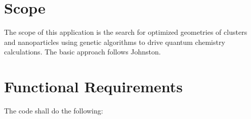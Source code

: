 \label{Requirements}

\section{Scope}
\label{Scope}

The scope of this application is the search for optimized geometries of clusters and nanoparticles using
genetic algorithms to drive quantum chemistry calculations. The basic approach follows Johnston.\cite{johnston}

\section{Functional Requirements}
\label{Functional_Requirements}

The code shall do the following:

